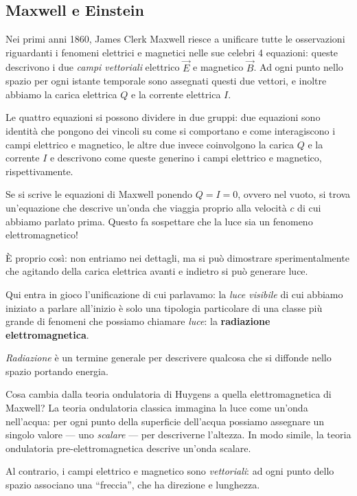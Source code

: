 \documentclass{article}
\begin{document}
\subsection{Maxwell e Einstein}

Nei primi anni 1860, James Clerk Maxwell riesce a unificare tutte le osservazioni riguardanti i fenomeni elettrici e magnetici nelle sue celebri 4 equazioni: queste descrivono i due \emph{campi vettoriali} elettrico \(\vec{E}\) e magnetico \(\vec{B}\). 
Ad ogni punto nello spazio per ogni istante temporale sono assegnati questi due vettori, e inoltre abbiamo la carica elettrica \(Q\) e la corrente elettrica \(I\). 

Le quattro equazioni si possono dividere in due gruppi: due equazioni sono identità che pongono dei vincoli su come si comportano e come interagiscono i campi elettrico e magnetico, le altre due invece coinvolgono la carica \(Q\) e la corrente \(I\) e descrivono come queste generino i campi elettrico e magnetico, rispettivamente. 

Se si scrive le equazioni di Maxwell ponendo \(Q = I = 0\), ovvero nel vuoto, si trova un'equazione che descrive un'onda che viaggia proprio alla velocità \(c\) di cui abbiamo parlato prima. 
Questo fa sospettare che la luce sia un fenomeno elettromagnetico! 

È proprio così: non entriamo nei dettagli, ma si può dimostrare sperimentalmente che agitando della carica elettrica avanti e indietro si può generare luce.

Qui entra in gioco l'unificazione di cui parlavamo: la \emph{luce visibile} di cui abbiamo iniziato a parlare all'inizio è solo una tipologia particolare di una classe più grande di fenomeni che possiamo chiamare \emph{luce}: la \textbf{radiazione elettromagnetica}.

\emph{Radiazione} è un termine generale per descrivere qualcosa che si diffonde nello spazio portando energia.

Cosa cambia dalla teoria ondulatoria di Huygens a quella elettromagnetica di Maxwell?
La teoria ondulatoria classica immagina la luce come un'onda nell'acqua: per ogni punto della superficie dell'acqua possiamo assegnare un singolo valore --- uno \emph{scalare} --- per descriverne l'altezza.
In modo simile, la teoria ondulatoria pre-elettromagnetica descrive un'onda scalare.

Al contrario, i campi elettrico e magnetico sono \emph{vettoriali}: ad ogni punto dello spazio associano una ``freccia'', che ha direzione e lunghezza.
\end{document}
